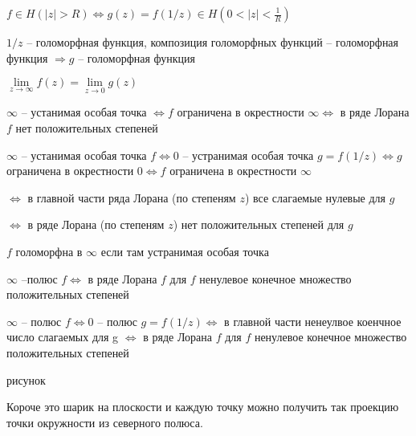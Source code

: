 \begin{remark}\thmslashn
	
	$f \in H(|z| > R) \Leftrightarrow g(z) = f(1/z) \in H( 0 < |z| < \frac{1}{R})$
	
	$1/z$ -- голоморфная функция, композиция голоморфных функций -- голоморфная функция $\Rightarrow g$ -- голоморфная функция
	
	$\lim\limits_{z \to \infty} f(z) = \lim\limits_{z \to 0} g(z)$ 
\end{remark}

\begin{statement}\thmslashn
	
	$\infty$ -- устанимая особая точка $\Leftrightarrow f$ ограничена в окрестности $\infty \Leftrightarrow$ в ряде Лорана $f$ нет положительных степеней
	
	$\infty$ -- устанимая особая точка $f \Leftrightarrow 0$ -- устранимая особая точка $g = f(1/z) \Leftrightarrow g$ ограничена в окрестности $0 \Leftrightarrow f$ ограничена в окрестности $\infty$
	
	$\Leftrightarrow$ в главной части ряда Лорана (по степеням $z$) все слагаемые нулевые для $g$
	
	$\Leftrightarrow$ в ряде Лорана (по степеням $z$) нет положительных степеней для $g$
	
\end{statement}

\begin{definition}\thmslashn
	
	$f$ голоморфна в $\infty$ если там устранимая особая точка
	 
\end{definition}

\begin{statement}\thmslashn
	
	$\infty$ --полюс $f \Leftrightarrow$ в ряде Лорана $f$ для $f$ ненулевое конечное множество положительных степеней
	
	$\infty$ -- полюс $f \Leftrightarrow 0$ -- полюс $g = f(1/z) \Leftrightarrow$ в главной части ненеулвое коенчное число слагаемых для g $\Leftrightarrow$ в ряде Лорана $f$ для $f$ ненулевое конечное множество положительных степеней
	
\end{statement}

\begin{definition}\thmslashn
	
	\TODO рисунок
	
	Короче это шарик на плоскости и каждую точку можно получить так проекцию точки окружности из северного полюса.
	
\end{definition}

